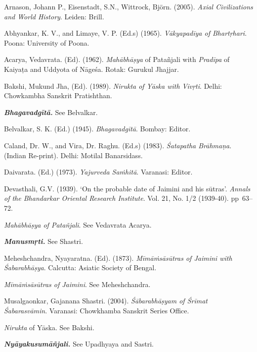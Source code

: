 \begin{thebibliography}{99}
 Arnason, Johann P., Eisenstadt, S.N., Wittrock, Björn. (2005). \textit{Axial Civilizations and World History}. Leiden: Brill. 

  Abhyankar, K. V., and Limaye, V. P. (Ed.s) (1965). \textit{Vākyapadīya of Bhartṛhari}. Poona: University of Poona.

  Acarya, Vedavrata.  (Ed). (1962). \textit{Mahābhāṣya} of Patañjali with \textit{Pradīpa} of Kaiyaṭa and Uddyota of Nāgeśa. Rotak: Gurukul Jhajjar.

  Bakshi, Mukund Jha, (Ed). (1989). \textit{Nirukta of Yāska with Vivṛti}. Delhi: Chowkambha Sanskrit Pratishthan.

  \textbf{\textit{Bhagavadgītā.}} See Belvalkar.

  Belvalkar, S. K. (Ed.) (1945). \textit{Bhagavadgītā}. Bombay: Editor.

  Caland, Dr. W., and Vira, Dr. Raghu. (Ed.s) (1983). \textit{Śatapatha Brāhmaṇa}. (Indian Re-print). Delhi: Motilal Banarsidass.

  Daivarata. (Ed.) (1973). \textit{Yajurveda Saṁhitā}. Varanasi: Editor.

  Devasthali, G.V. (1939). ‘On the probable date of Jaimini and his sūtras’. \textit{Annals of the Bhandarkar Oriental Research Institute}. Vol. 21, No. 1/2 (1939-40). pp~63--72.

  \textit{Mahābhāṣya of Patañjali}. See Vedavrata Acarya.

  \textbf{\textit{Manusmṛti.}} See Shastri.

  Meheshchandra, Nyayaratna. (Ed). (1873). \textit{Mīmāṁsāsūtras of Jaimini with Śabarabhāṣya}. Calcutta: Asiatic Society of Bengal.

  \textit{Mīmāṁsāsūtras of Jaimini}. See Meheshchandra.

  Musalgaonkar, Gajanana Shastri. (2004). \textit{Śābarabhāṣyam of Śrīmat Śabarasvāmin}. Varanasi: Chowkhamba Sanskrit Series Office.

  \textit{Nirukta} of Yāska. See Bakshi.

  \textbf{\textit{Nyāyakusumāñjali.}} See Upadhyaya and Sastri.


\end{thebibliography}
